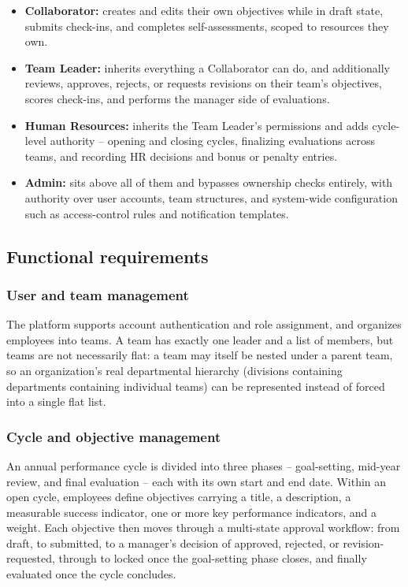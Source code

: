 \documentclass[12pt,a4paper]{report}
\begin{document}
\begin{itemize}
    \item \textbf{Collaborator:} creates and edits their own objectives while in draft state, submits check-ins, and completes self-assessments, scoped to resources they own.
    \item \textbf{Team Leader:} inherits everything a Collaborator can do, and additionally reviews, approves, rejects, or requests revisions on their team's objectives, scores check-ins, and performs the manager side of evaluations.
    \item \textbf{Human Resources:} inherits the Team Leader's permissions and adds cycle-level authority -- opening and closing cycles, finalizing evaluations across teams, and recording HR decisions and bonus or penalty entries.
    \item \textbf{Admin:} sits above all of them and bypasses ownership checks entirely, with authority over user accounts, team structures, and system-wide configuration such as access-control rules and notification templates.
\end{itemize}

\subsection{Functional requirements}

\subsubsection{User and team management}

The platform supports account authentication and role assignment, and organizes employees into teams. A team has exactly one leader and a list of members, but teams are not necessarily flat: a team may itself be nested under a parent team, so an organization's real departmental hierarchy (divisions containing departments containing individual teams) can be represented instead of forced into a single flat list.

\subsubsection{Cycle and objective management}

An annual performance cycle is divided into three phases -- goal-setting, mid-year review, and final evaluation -- each with its own start and end date. Within an open cycle, employees define objectives carrying a title, a description, a measurable success indicator, one or more key performance indicators, and a weight. Each objective then moves through a multi-state approval workflow: from draft, to submitted, to a manager's decision of approved, rejected, or revision-requested, through to locked once the goal-setting phase closes, and finally evaluated once the cycle concludes.
\end{document}
